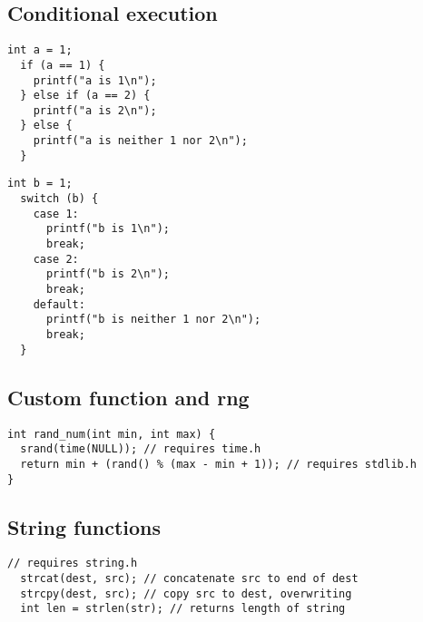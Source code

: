 \documentclass{article}
\begin{document}
\subsection{Conditional execution}
\begin{multicols}{2}
\begin{lstlisting}[style=CStyle]
  int a = 1;
  if (a == 1) {
    printf("a is 1\n");
  } else if (a == 2) {
    printf("a is 2\n");
  } else {
    printf("a is neither 1 nor 2\n");
  }
\end{lstlisting}\columnbreak
\begin{lstlisting}[style=CStyle]
  int b = 1;
  switch (b) {
    case 1:
      printf("b is 1\n");
      break;
    case 2:
      printf("b is 2\n");
      break;
    default:
      printf("b is neither 1 nor 2\n");
      break;
  }
\end{lstlisting}
\end{multicols}

\subsection{Custom function and rng}
\begin{lstlisting}[style=CStyle]
int rand_num(int min, int max) {
  srand(time(NULL)); // requires time.h
  return min + (rand() % (max - min + 1)); // requires stdlib.h
}
\end{lstlisting}

\subsection{String functions}
\begin{lstlisting}[style=CStyle]
// requires string.h
  strcat(dest, src); // concatenate src to end of dest
  strcpy(dest, src); // copy src to dest, overwriting
  int len = strlen(str); // returns length of string
\end{lstlisting}
\end{document}
